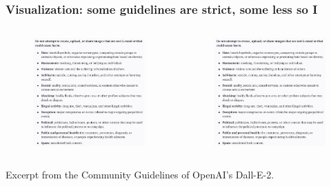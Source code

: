 \documentclass[
	11pt, compress%
]{beamer}
\begin{document}
\begin{frame}
	\frametitle{Visualization: some guidelines are strict, some less so I}
	\begin{columns}[c] 
		\begin{column}{0.5\textwidth} %
			\begin{figure}
				\includegraphics[width=0.9\linewidth]{Images/CommunityGuidelinesDALLE2_1.png}
			\end{figure}
		\end{column}
		\begin{column}{0.5\textwidth} %
			\begin{figure}
				\includegraphics[width=0.9\linewidth]{Images/CommunityGuidelinesDALLE2_1.png}
			\end{figure}
		\end{column}
	\end{columns}
	\smallskip
	\tiny Excerpt from the Community Guidelines of OpenAI's Dall-E-2\cite{DallETOS}.
\end{frame}
\end{document}
